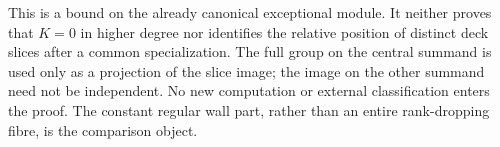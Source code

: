 \begin{remark}
\label{rem:DE-Lang-deck-slice-scope}
This is a bound on the already canonical exceptional module.
It neither proves that \(K=0\) in higher degree nor identifies
the relative position of distinct deck slices after a common
specialization. The full group on the central summand is used
only as a projection of the slice image; the image on the other
summand need not be independent. No new computation or external
classification enters the proof. The constant regular wall part,
rather than an entire rank-dropping fibre, is the comparison object.
\end{remark}
